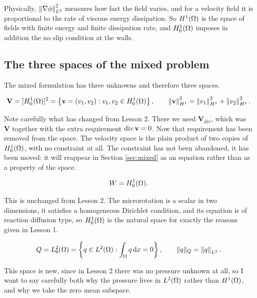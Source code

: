 \documentclass[11pt,a4paper]{article}
\newcommand{\Vdiv}{\mathbf{V}_{\mathrm{div}}}
\newcommand{\Vsp}{\mathbf{V}}
\newcommand{\Qsp}{Q}
\newcommand{\Wsp}{W}
\begin{document}
Physically, $\left\lVert \nabla \phi \right\rVert_{L^{2}}^{2}$ measures how fast the field varies, and for
a velocity field it is proportional to the rate of viscous energy dissipation.
So $H^{1}(\Omega)$ is the space of fields with finite energy and finite dissipation
rate, and $H^{1}_{0}(\Omega)$ imposes in addition the no slip condition at the walls.

\subsection{The three spaces of the mixed problem}

The mixed formulation has three unknowns and therefore three spaces.

\begin{definition}
\[
  \Vsp = [\Honezero]^{2}
  = \left\{ \bv = (v_{1},v_{2}) : v_{1}, v_{2} \in \Honezero \right\} ,
  \qquad
  \normH{\bv}^{2} = \normH{v_{1}}^{2} + \normH{v_{2}}^{2} .
\]
\end{definition}

Note carefully what has changed from Lesson 2. There we used $\Vdiv$, which was
$\Vsp$ together with the extra requirement $\operatorname{div} \mathbf{v} = 0$. Now that requirement
has been removed from the space. The velocity space is the plain product of two
copies of $H^{1}_{0}(\Omega)$, with no constraint at all. The constraint has not been
abandoned, it has been moved: it will reappear in Section \ref{sec:mixed} as an
equation rather than as a property of the space.

\begin{definition}
\[
  \Wsp = \Honezero .
\]
\end{definition}

This is unchanged from Lesson 2. The microrotation is a scalar in two
dimensions, it satisfies a homogeneous Dirichlet condition, and its equation is
of reaction diffusion type, so $H^{1}_{0}(\Omega)$ is the natural space for exactly the
reasons given in Lesson 1.

\begin{definition}\label{def:Q}
\[
  \Qsp = \Ltwozero = \left\{ q \in \Ltwo : \int_\Om q \dx = 0 \right\} ,
  \qquad
  \lVert q \rVert_{\Qsp} = \normL{q} .
\]
\end{definition}

This space is new, since in Lesson 2 there was no pressure unknown at all, so I
want to say carefully both why the pressure lives in $L^{2}(\Omega)$ rather than
$H^{1}(\Omega)$, and why we take the zero mean subspace.
\end{document}
